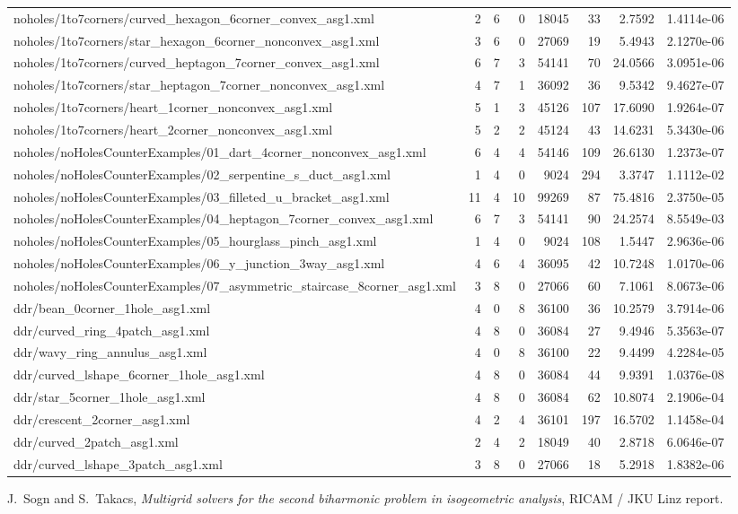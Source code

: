 \documentclass[11pt,a4paper]{article}
\begin{document}
\begin{longtable}{>{\ttfamily\scriptsize\raggedright\arraybackslash}p{8.4cm}rrrrrrr}
noholes/1to7corners/curved\_hexagon\_6corner\_convex\_asg1.xml & 2 & 6 & 0 & 18045 & 33 & 2.7592 & 1.4114e-06 \\
noholes/1to7corners/star\_hexagon\_6corner\_nonconvex\_asg1.xml & 3 & 6 & 0 & 27069 & 19 & 5.4943 & 2.1270e-06 \\
noholes/1to7corners/curved\_heptagon\_7corner\_convex\_asg1.xml & 6 & 7 & 3 & 54141 & 70 & 24.0566 & 3.0951e-06 \\
noholes/1to7corners/star\_heptagon\_7corner\_nonconvex\_asg1.xml & 4 & 7 & 1 & 36092 & 36 & 9.5342 & 9.4627e-07 \\
noholes/1to7corners/heart\_1corner\_nonconvex\_asg1.xml & 5 & 1 & 3 & 45126 & 107 & 17.6090 & 1.9264e-07 \\
noholes/1to7corners/heart\_2corner\_nonconvex\_asg1.xml & 5 & 2 & 2 & 45124 & 43 & 14.6231 & 5.3430e-06 \\
noholes/noHolesCounterExamples/01\_dart\_4corner\_nonconvex\_asg1.xml & 6 & 4 & 4 & 54146 & 109 & 26.6130 & 1.2373e-07 \\
noholes/noHolesCounterExamples/02\_serpentine\_s\_duct\_asg1.xml & 1 & 4 & 0 & 9024 & 294 & 3.3747 & 1.1112e-02 \\
noholes/noHolesCounterExamples/03\_filleted\_u\_bracket\_asg1.xml & 11 & 4 & 10 & 99269 & 87 & 75.4816 & 2.3750e-05 \\
noholes/noHolesCounterExamples/04\_heptagon\_7corner\_convex\_asg1.xml & 6 & 7 & 3 & 54141 & 90 & 24.2574 & 8.5549e-03 \\
noholes/noHolesCounterExamples/05\_hourglass\_pinch\_asg1.xml & 1 & 4 & 0 & 9024 & 108 & 1.5447 & 2.9636e-06 \\
noholes/noHolesCounterExamples/06\_y\_junction\_3way\_asg1.xml & 4 & 6 & 4 & 36095 & 42 & 10.7248 & 1.0170e-06 \\
noholes/noHolesCounterExamples/07\_asymmetric\_staircase\_8corner\_asg1.xml & 3 & 8 & 0 & 27066 & 60 & 7.1061 & 8.0673e-06 \\
ddr/bean\_0corner\_1hole\_asg1.xml & 4 & 0 & 8 & 36100 & 36 & 10.2579 & 3.7914e-06 \\
ddr/curved\_ring\_4patch\_asg1.xml & 4 & 8 & 0 & 36084 & 27 & 9.4946 & 5.3563e-07 \\
ddr/wavy\_ring\_annulus\_asg1.xml & 4 & 0 & 8 & 36100 & 22 & 9.4499 & 4.2284e-05 \\
ddr/curved\_lshape\_6corner\_1hole\_asg1.xml & 4 & 8 & 0 & 36084 & 44 & 9.9391 & 1.0376e-08 \\
ddr/star\_5corner\_1hole\_asg1.xml & 4 & 8 & 0 & 36084 & 62 & 10.8074 & 2.1906e-04 \\
ddr/crescent\_2corner\_asg1.xml & 4 & 2 & 4 & 36101 & 197 & 16.5702 & 1.1458e-04 \\
ddr/curved\_2patch\_asg1.xml & 2 & 4 & 2 & 18049 & 40 & 2.8718 & 6.0646e-07 \\
ddr/curved\_lshape\_3patch\_asg1.xml & 3 & 8 & 0 & 27066 & 18 & 5.2918 & 1.8382e-06 \\
\end{longtable}
\normalsize

\begin{thebibliography}{9}
J.~Sogn and S.~Takacs,
\emph{Multigrid solvers for the second biharmonic problem in isogeometric analysis},
RICAM / JKU Linz report.
\end{thebibliography}
\end{document}
